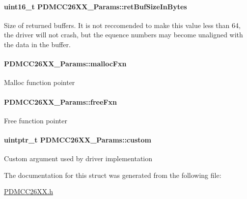 \paragraph[{ret\+Buf\+Size\+In\+Bytes}]{\setlength{\rightskip}{0pt plus 5cm}uint16\+\_\+t P\+D\+M\+C\+C26\+X\+X\+\_\+\+Params\+::ret\+Buf\+Size\+In\+Bytes}\label{struct_p_d_m_c_c26_x_x___params_a05bff0a3c2ddbb3a49c2bc7a47a7fe24}
Size of returned buffers. It is not reccomended to make this value less than 64, the driver will not crash, but the equence numbers may become unaligned with the data in the buffer. 
\paragraph[{malloc\+Fxn}]{ P\+D\+M\+C\+C26\+X\+X\+\_\+\+Params\+::malloc\+Fxn}\label{struct_p_d_m_c_c26_x_x___params_aea959cfd6c30b0af7f4c9547c5186d0a}
Malloc function pointer 
\paragraph[{free\+Fxn}]{ P\+D\+M\+C\+C26\+X\+X\+\_\+\+Params\+::free\+Fxn}\label{struct_p_d_m_c_c26_x_x___params_ae0149ca1615d25422c7e0d9c473ccd2e}
Free function pointer 
\paragraph[{custom}]{\setlength{\rightskip}{0pt plus 5cm}uintptr\+\_\+t P\+D\+M\+C\+C26\+X\+X\+\_\+\+Params\+::custom}\label{struct_p_d_m_c_c26_x_x___params_ad41793869ce12a57f513749b244aa1a3}
Custom argument used by driver implementation 

The documentation for this struct was generated from the following file\+:\begin{DoxyCompactItemize}
\item 
\hyperlink{_p_d_m_c_c26_x_x_8h}{P\+D\+M\+C\+C26\+X\+X.\+h}\end{DoxyCompactItemize}
